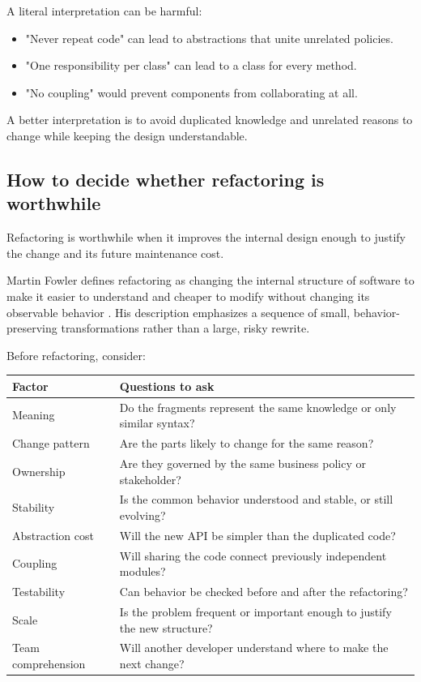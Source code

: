 \documentclass[12pt,a4paper]{article}
\begin{document}
A literal interpretation can be harmful:

\begin{itemize}

\item "Never repeat code" can lead to abstractions that unite unrelated policies.

\item "One responsibility per class" can lead to a class for every method.

\item "No coupling" would prevent components from collaborating at all.

\end{itemize}

A better interpretation is to avoid duplicated knowledge and unrelated reasons to change while keeping the design understandable.

\subsection{How to decide whether refactoring is worthwhile}

Refactoring is worthwhile when it improves the internal design enough to justify the change and its future maintenance cost.

Martin Fowler defines refactoring as changing the internal structure of software to make it easier to understand and cheaper to modify without changing its observable behavior \cite{fowler2004refactoring,fowler2018refactoring}. His description emphasizes a sequence of small, behavior-preserving transformations rather than a large, risky rewrite.

Before refactoring, consider:

\begin{table}[htbp]
\centering
\small
\begin{tabularx}{\textwidth}{>{\raggedright\arraybackslash}p{}X}
\toprule
Factor & Questions to ask \\
\midrule
Meaning & Do the fragments represent the same knowledge or only similar syntax? \\
Change pattern & Are the parts likely to change for the same reason? \\
Ownership & Are they governed by the same business policy or stakeholder? \\
Stability & Is the common behavior understood and stable, or still evolving? \\
Abstraction cost & Will the new API be simpler than the duplicated code? \\
Coupling & Will sharing the code connect previously independent modules? \\
Testability & Can behavior be checked before and after the refactoring? \\
Scale & Is the problem frequent or important enough to justify the new structure? \\
Team comprehension & Will another developer understand where to make the next change? \\
\bottomrule
\end{tabularx}
\end{table}
\end{document}

